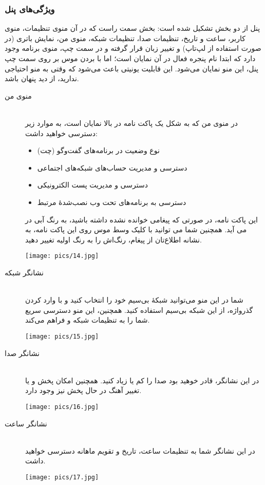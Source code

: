 \subsubsection{ویژگی‌های پنل}
پنل از دو بخش تشکیل شده است: بخش سمت راست که در آن منوی تنظیمات، منوی کاربر، ساعت و تاریخ، تنظیمات صدا، تنظیمات شبکه، منوی من، نمایش باتری (در صورت استفاده از لپ‌تاپ) و تغییر زبان قرار گرفته و در سمت چپ، منوی برنامه وجود دارد که ابتدا نام پنجره فعال در آن نمایان است؛ اما با بردن موس بر روی سمت چپ پنل، این منو نمایان می‌شود. این قابلیت یونیتی باعث می‌شود که وقتی به منو احتیاجی ندارید، از دید پنهان باشد.
\begin{description}
\item[منوی من] \hfill \\
در منوی من که به شکل یک پاکت نامه در بالا نمایان است، به موارد زیر دسترسی خواهید داشت:
\begin{itemize}
\item نوع وضعیت در برنامه‌های گفت‌وگو (چت)
\item دسترسی و مدیریت حساب‌های شبکه‌های اجتماعی
\item دسترسی و مدیریت پست الکترونیکی
\item دسترسی به برنامه‌های تحت وب نصب‌شدهٔ مرتبط
\end{itemize}
این پاکت نامه، در صورتی که پیغامی خوانده نشده داشته باشید، به رنگ آبی در می آید. همچنین شما می توانید با کلیک وسط موس روی این پاکت نامه، به نشانه اطلاع‌تان از پیغام، رنگ‌اش را به رنگ اولیه تغییر دهید.
\begin{center}
\texttt{[image: pics/14.jpg]}
\end{center}

\item[نشانگر شبکه] \hfill \\
شما در این منو می‌توانید شبکهٔ بی‌سیم خود را انتخاب کنید و با وارد کردن گذرواژه، از این شبکه بی‌سیم استفاده کنید. همچنین، این منو دسترسی سریع شما را به تنظیمات شبکه و  فراهم می‌کند.
\begin{center}
\texttt{[image: pics/15.jpg]}
\end{center}

\item[نشانگر صدا] \hfill \\
در این نشانگر، قادر خوهید بود صدا را کم یا زیاد کنید. همچنین امکان پخش و یا تغییر آهنگ در حال پخش نیز وجود دارد.
\begin{center}
\texttt{[image: pics/16.jpg]}
\end{center}

\item[نشانگر ساعت] \hfill \\
در این نشانگر شما به تنظیمات ساعت، تاریخ و تقویم ماهانه دسترسی خواهید داشت.
\begin{center}
\texttt{[image: pics/17.jpg]}
\end{center}


\end{description}
